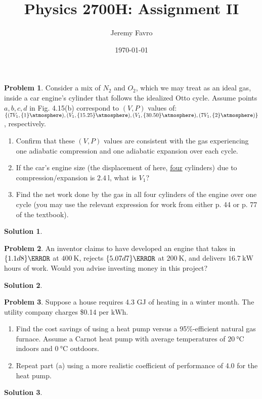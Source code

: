 \documentclass[10pt]{article}
\title{Physics 2700H: Assignment II}
\author{Jeremy Favro}
\date{\today}
\theoremstyle{definition}
\newtheorem{problem}{Problem}
\newtheorem{soln}{Solution}
\begin{document}
\maketitle

\begin{problem}
Consider a mix of $N_2$ and $O_2$, which we may treat as an ideal gas, inside a car engine's cylinder that
follows the idealized Otto cycle. Assume points ${a,b,c,d}$ in Fig. 4.15(b)
correspond to $(V,P)$ values of: $\left\{(7V_1,\qty{1}{\atmosphere}), (V_1, \qty{15.25}{\atmosphere}), (V_1, \qty{30.50}{\atmosphere}), (7V_1, \qty{2}{\atmosphere})\right\}$,
respectively.
\begin{enumerate}[label=(\alph*)]
  \item Confirm that these $(V,P)$ values are consistent with the gas experiencing one adiabatic
        compression and one adiabatic expansion over each cycle.
  \item If the car's engine size (the displacement of here, \underline{four} cylinders) due to compression/expansion is $\qty{2.4}{\litre}$, what is $V_1$?
  \item Find the net work done by the gas in all four cylinders of the engine over one cycle (you may use the relevant expression for work from either p. 44 or p. 77 of the textbook).
\end{enumerate}
\end{problem}
\begin{soln}
\end{soln}

\begin{problem}
An inventor claims to have developed an engine that takes in $\qty{1.1d8}{\joule}$ at $\qty{400}{\kelvin}$,
rejects $\qty{5.07d7}{\joule}$ at $\qty{200}{\kelvin}$, and delivers $\qty{16.7}{\kilo\watt}$ hours of work.
Would you advise investing money in this project?
\end{problem}
\begin{soln}
\end{soln}

\begin{problem}
Suppose a house requires 4.3 GJ of heating in a winter month. The
utility company charges \$0.14 per $\unit{\kilo\watt\hour}$.
\begin{enumerate}[label=(\alph*)]
  \item Find the cost savings of using a heat pump versus a 95\%-efficient natural gas furnace. Assume
        a Carnot heat pump with average temperatures of $\qty{20}{\degreeCelsius}$ indoors and $\qty{0}{\degreeCelsius}$ outdoors.
  \item Repeat part (a) using a more realistic coefficient of performance of 4.0 for the heat pump.
\end{enumerate}
\end{problem}
\begin{soln}
\end{soln}
\end{document}
